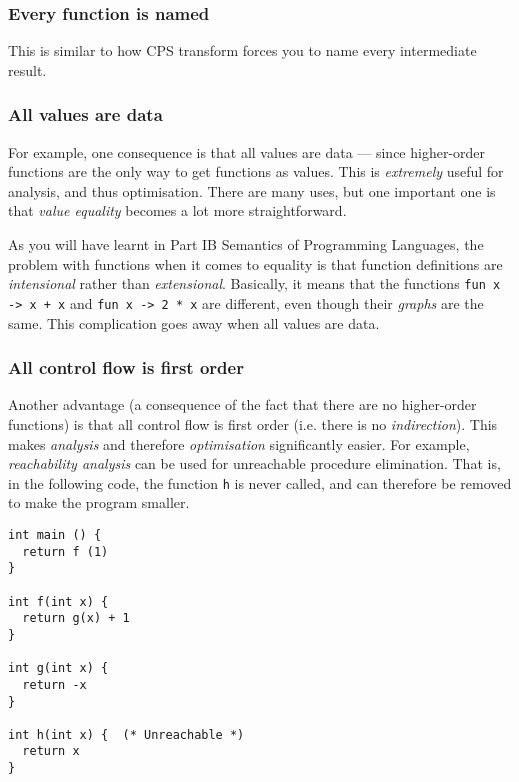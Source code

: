 \subsubsection{Every function is named}
This is similar to how CPS transform forces you to name every intermediate result. 

\subsubsection{All values are data}
For example, one consequence is that all values are data --- since higher-order functions are the only way to get functions as values. This is \emph{extremely} useful for analysis, and thus optimisation. There are many uses, but one important one is that \emph{value equality} becomes a lot more straightforward. 

As you will have learnt in {\sffamily Part IB Semantics of Programming Languages}, the problem with functions when it comes to equality is that function definitions are \emph{intensional} rather than \emph{extensional}. Basically, it means that the functions \texttt{fun x -> x + x} and \texttt{fun x -> 2 * x} are different, even though their \emph{graphs} are the same. This complication goes away when all values are data.

\subsubsection{All control flow is first order}
Another advantage (a consequence of the fact that there are no higher-order functions) is that all control flow is first order (i.e. there is no \emph{indirection}). This makes \emph{analysis} and therefore \emph{optimisation} significantly easier. For example, \emph{reachability analysis} can be used for unreachable procedure elimination. That is, in the following code, the function \texttt{h} is never called, and can therefore be removed to make the program smaller.

\begin{code}
\label{code:unreachable-c}
\begin{verbatim}
int main () {
  return f (1)
}

int f(int x) {
  return g(x) + 1
}

int g(int x) {
  return -x
}

int h(int x) {  (* Unreachable *)
  return x
}
\end{verbatim}
\end{code}

